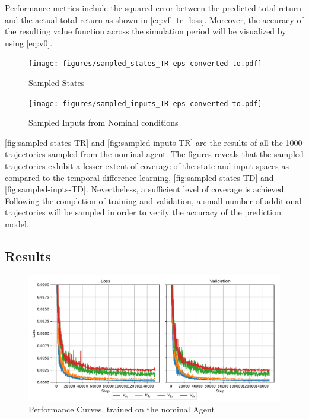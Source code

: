 Performance metrics include the squared error between the predicted total return and the actual total return as shown in \autoref{eq:vf_tr_loss}. Moreover, the accuracy of the resulting value function across the simulation period will be visualized by using \autoref{eq:v0}.


\begin{figure}[H]
    \centering
    \texttt{[image: figures/sampled\_states\_TR-eps-converted-to.pdf]}
    \caption{Sampled States}
    \label{fig:sampled-states-TR}
\end{figure}


\begin{figure}[H]
    \centering
    \texttt{[image: figures/sampled\_inputs\_TR-eps-converted-to.pdf]}
    \caption{Sampled Inputs from Nominal conditions}
    \label{fig:sampled-inputs-TR}
\end{figure}

\autoref{fig:sampled-states-TR} and \autoref{fig:sampled-inputs-TR} are the results of all the 1000 trajectories sampled from the nominal agent. The figures reveals that the sampled trajectories exhibit a lesser extent of coverage of the state and input spaces as compared to the temporal difference learning, \autoref{fig:sampled-states-TD} and \autoref{fig:sampled-inpts-TD}. Nevertheless, a sufficient level of coverage is achieved. Following the completion of training and validation, a small number of additional trajectories will be sampled in order to verify the accuracy of the prediction model.


\subsection{Results}

\begin{figure}[H]
    \centering
    \includegraphics[width = \textwidth]{figures/tr_training_graphs.pdf}
    \caption{Performance Curves, trained on the nominal Agent}
    \label{fig:tr_perf_curves}
\end{figure}


